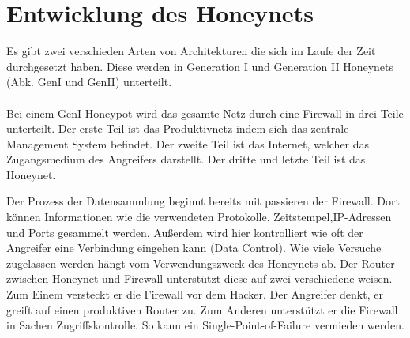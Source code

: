 \section{Entwicklung des Honeynets}
Es gibt zwei verschieden Arten von Architekturen die sich im Laufe der Zeit durchgesetzt haben. Diese werden in Generation I und Generation II Honeynets (Abk. GenI und GenII) unterteilt.\\
\\
Bei einem GenI Honeypot wird das gesamte Netz durch eine Firewall in drei Teile unterteilt. Der erste Teil ist das Produktivnetz indem sich das zentrale Management System befindet. Der zweite Teil ist das Internet, welcher das Zugangsmedium des Angreifers darstellt. Der dritte und letzte Teil ist das Honeynet. 

Der Prozess der Datensammlung beginnt bereits mit passieren der Firewall. Dort können Informationen wie die verwendeten Protokolle, Zeitstempel,IP-Adressen und Ports gesammelt werden. Außerdem wird hier kontrolliert wie oft der Angreifer eine Verbindung eingehen kann (Data Control). Wie viele Versuche zugelassen werden hängt vom Verwendungszweck des Honeynets ab. Der Router zwischen Honeynet und Firewall unterstützt diese auf zwei verschiedene weisen. Zum Einem versteckt er die Firewall vor dem Hacker. Der Angreifer denkt, er greift auf einen produktiven Router zu. Zum Anderen unterstützt er die Firewall in Sachen Zugriffskontrolle. So kann ein Single-Point-of-Failure vermieden werden. 

